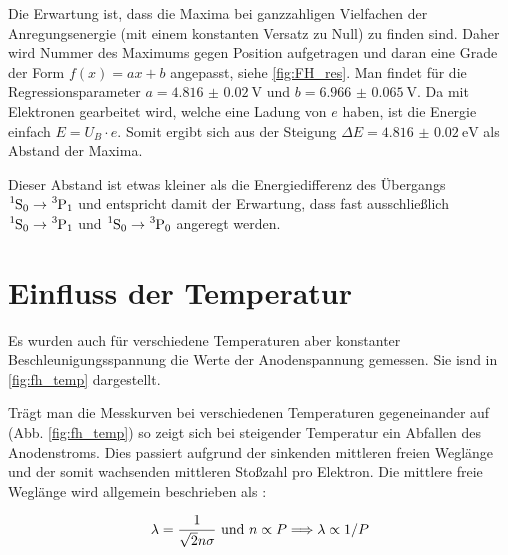 
Die Erwartung ist, dass die Maxima bei ganzzahligen Vielfachen der Anregungsenergie (mit einem konstanten Versatz zu Null) zu finden sind. Daher wird Nummer des Maximums gegen Position aufgetragen und daran eine Grade der Form $f(x) = a x + b$ angepasst, siehe \ref{fig:FH_res}. Man findet für die Regressionsparameter $a = \SI{4.816(20)}{\volt}$ und $b = \SI{6.966(65)}{\volt}$.
Da mit Elektronen gearbeitet wird, welche eine Ladung von $e$ haben, ist die Energie einfach $E = U_B \cdot e$. Somit ergibt sich aus der Steigung $\Delta E = \SI{4.816(20)}{\electronvolt}$ als Abstand der Maxima.

Dieser Abstand ist etwas kleiner als die Energiedifferenz des Übergangs $\ce{^1S_0} \rightarrow \ce{^3P_1}$ und entspricht damit der Erwartung, dass fast ausschließlich $\ce{^1S_0} \rightarrow \ce{^3P_1}$ und $\ce{^1S_0} \rightarrow \ce{^3P_0}$ angeregt werden.



\section{Einfluss der Temperatur}

Es wurden auch für verschiedene Temperaturen aber konstanter Beschleunigungsspannung die Werte der Anodenspannung gemessen. Sie isnd in \ref{fig:fh_temp} dargestellt.


Trägt man die Messkurven bei verschiedenen Temperaturen gegeneinander auf (Abb. \ref{fig:fh_temp}) so zeigt sich bei steigender Temperatur ein Abfallen des Anodenstroms. Dies passiert aufgrund der sinkenden mittleren freien Weglänge und der somit wachsenden mittleren Stoßzahl pro Elektron.
Die mittlere freie Weglänge wird allgemein beschrieben als \cite[126-127]{gerthsen}:

\begin{align}
	\lambda = \frac{1}{\sqrt{2} n \sigma} \text{ und } n \propto P  \Longrightarrow \lambda \propto 1 / P \label{eq:mfp}
\end{align}


